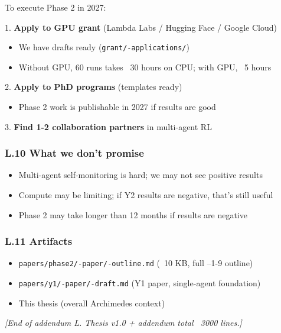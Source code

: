\documentclass[11pt]{article}
\begin{document}
To execute Phase 2 in 2027:

1. \textbf{Apply to GPU grant} (Lambda Labs / Hugging Face / Google Cloud)
\begin{itemize}
  \item We have drafts ready (\texttt{grant/-applications/})
  \item Without GPU, 60 runs takes ~30 hours on CPU; with GPU, ~5 hours
\end{itemize}

2. \textbf{Apply to PhD programs} (templates ready)
\begin{itemize}
  \item Phase 2 work is publishable in 2027 if results are good
\end{itemize}

3. \textbf{Find 1-2 collaboration partners} in multi-agent RL

\subsubsection{L.10 What we don't promise}

\begin{itemize}
  \item Multi-agent self-monitoring is hard; we may not see positive results
  \item Compute may be limiting; if Y2 results are negative, that's still useful
  \item Phase 2 may take longer than 12 months if results are negative
\end{itemize}


\subsubsection{L.11 Artifacts}

\begin{itemize}
  \item \texttt{papers/phase2/-paper/-outline.md} (~10 KB, full --1-9 outline)
  \item \texttt{papers/y1/-paper/-draft.md} (Y1 paper, single-agent foundation)
  \item This thesis (overall Archimedes context)
\end{itemize}


\hrulefill

\textit{[End of addendum L. Thesis v1.0 + addendum total ~3000 lines.]}
\end{document}
